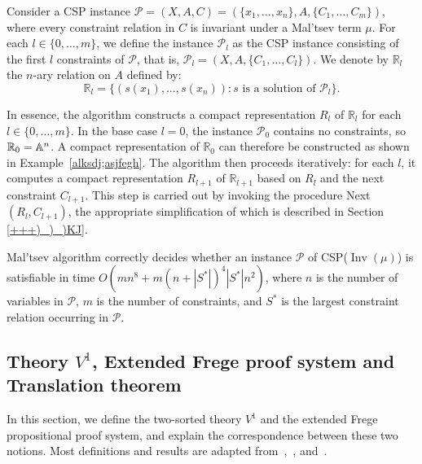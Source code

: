 \documentclass{article}
\newcommand{\A}{\ensuremath\mathbb{A}}
\newcommand{\R}{\mathbb{R}}
\theoremstyle{definition}
\theoremstyle{theorem}
\theoremstyle{theorem}
\theoremstyle{remark}
\theoremstyle{remark}
\theoremstyle{example}
\theoremstyle{notation}
\theoremstyle{theorem}
\begin{document}
Consider a CSP instance $\mathcal{P} = (X, A, C) = (\{x_1, \ldots, x_n\}, A, \{C_1, \ldots, C_m\})$, where every constraint relation in $C$ is invariant under a Mal'tsev term $\mu$. For each $l \in \{0, \ldots, m\}$, we define the instance $\mathcal{P}_l$ as the CSP instance consisting of the first $l$ constraints of $\mathcal{P}$, that is, $\mathcal{P}_l = (X, A, \{C_1, \ldots, C_l\})$. We denote by $\R_l$ the $n$-ary relation on $A$ defined by:
$$
\R_l = \{(s(x_1), \ldots, s(x_n)) : s \text{ is a solution of } \mathcal{P}_l\}.
$$

In essence, the algorithm constructs a compact representation $R_l$ of $\R_l$ for each $l \in \{0, \ldots, m\}$. In the base case $l = 0$, the instance $\mathcal{P}_0$ contains no constraints, so $\R_0 = \A^n$. A compact representation of $\R_0$ can therefore be constructed as shown in Example~\ref{alksdj;asjfegh}. The algorithm then proceeds iteratively: for each $l$, it computes a compact representation $R_{l+1}$ of $\R_{l+1}$ based on $R_l$ and the next constraint $C_{l+1}$. This step is carried out by invoking the procedure {\sc Next}$(R_l, C_{l+1})$, the appropriate simplification of which is described in Section \ref{+++)_)_)KJ}. 

Mal'tsev algorithm correctly decides whether an instance $\mathcal{P}$ of CSP($\operatorname{Inv}(\mu)$) is satisfiable in time $O(mn^8 + m(n + |S^*|)^4 |S^*| n^2)$, where $n$ is the number of variables in $\mathcal{P}$, $m$ is the number of constraints, and $S^*$ is the largest constraint relation occurring in $\mathcal{P}$.



\subsection{Theory $V^1$, Extended Frege proof system and Translation theorem}\label{==-asl;iyfg;iy}

In this section, we define the two-sorted theory $V^1$ and the extended Frege propositional proof system, and explain the correspondence between these two notions. Most definitions and results are adapted from~\cite{10.5555/1734064},~\cite{krajicek_1995}, and~\cite{krajicek2019proof}. 
\end{document}

